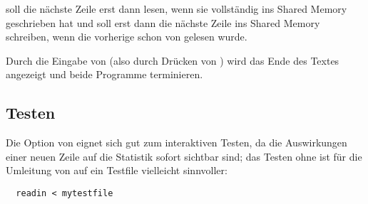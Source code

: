  soll die nächste Zeile erst dann lesen, wenn 
sie vollständig ins Shared Memory geschrieben hat und  soll
erst dann die nächste Zeile ins Shared Memory schreiben, wenn die vorherige
schon von  gelesen wurde.

Durch die Eingabe von  (also durch Drücken von
) wird das Ende des Textes angezeigt und beide Programme
terminieren.

\subsection*{Testen}

Die Option  von  eignet sich gut zum interaktiven
Testen, da die Auswirkungen einer neuen Zeile auf die Statistik sofort
sichtbar sind; das Testen ohne  ist für die Umleitung von
 auf ein Testfile vielleicht sinnvoller:
\begin{verbatim}
  readin < mytestfile
\end{verbatim}

\osueguidelinesthree


